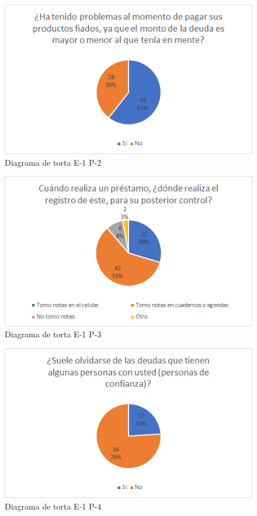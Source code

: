 {{		\begin{figure}[H]
			\centering
			\includegraphics[width=0.8\linewidth]{annexes/e1-p2.png}
			\caption{Diagrama de torta E-1 P-2}
		\end{figure}
	
		\begin{figure}[H]
			\centering
			\includegraphics[width=0.8\linewidth]{annexes/e1-p3.png}
			\caption{Diagrama de torta E-1 P-3}
		\end{figure}
	
		\begin{figure}[H]
			\centering
			\includegraphics[width=0.8\linewidth]{annexes/e1-p4.png}
			\caption{Diagrama de torta E-1 P-4}
		\end{figure}
	
}}
